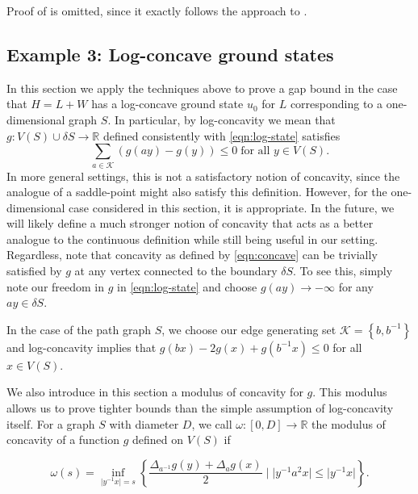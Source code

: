 \DirichletH*

Proof of  is omitted, since it exactly follows the approach to .

\subsection{Example 3: Log-concave ground states}\label{sec:log-concave}
In this section we apply the techniques above to prove a gap bound in the case that $H=L+W$ has a log-concave ground state $u_0$ for $L$ corresponding to a one-dimensional graph $S$. In particular, by log-concavity we mean that $g:V(S)\cup \delta S \longrightarrow \mathbb{R}$ defined consistently with \cref{eqn:log-state} satisfies
\begin{equation}\label{eqn:concave}
	\sum_{a \in \mathcal{K}} \left(g(ay) - g(y)\right) \leq 0 \; \text{for all $y \in V(S)$}.
\end{equation}
In more general settings, this is not a satisfactory notion of concavity, since the analogue of a saddle-point might also satisfy this definition. However, for the one-dimensional case considered in this section, it is appropriate. In the future, we will likely define a much stronger notion of concavity that acts as a better analogue to the continuous definition while still being useful in our setting. Regardless, note that concavity as defined by \cref{eqn:concave} can be trivially satisfied by $g$ at any vertex connected to the boundary $\delta S$. To see this, simply note our freedom in $g$ in \cref{eqn:log-state} and choose $g(ay) \rightarrow -\infty$ for any $ay \in \delta S$.

In the case of the path graph $S$, we choose our edge generating set $\mathcal{K}=\left\{b,b^{-1}\right\}$ and log-concavity implies that $g(bx)-2g(x)+g(b^{-1}x) \leq 0$ for all $x \in V(S)$. 

We also introduce in this section a modulus of concavity for $g$. This modulus allows us to prove tighter bounds than the simple assumption of log-concavity itself. For a graph $S$ with diameter $D$, we call $\omega:[0,D]\longrightarrow \mathbb{R}$ the modulus of concavity of a function $g$ defined on $V(S)$ if

\begin{equation}\label{eqn:modulus_contraction}
    \omega(s) = \inf_{\lvert y^{-1}x\rvert = s} \left\{ \frac{\Delta_{a^{-1}} g(y) + \Delta_{a}g(x)}{2} \; \bigg\vert \; \lvert y^{-1}a^{2}x\rvert \leq \lvert y^{-1}x\rvert\right\}.
\end{equation}

